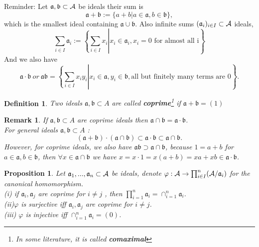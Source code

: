 \documentclass[11pt]{article}
\newtheorem{prop}[thm]{Proposition}
\newtheorem{dfn}[thm]{Definition}
\newtheorem{rmk}[thm]{Remark}
\newcommand{\sca}{{\mathfrak a}}
\newcommand{\scb}{{\mathfrak b}}
\newcommand{\cala}{{\cal A}}
\begin{document}
Reminder: Let $\sca,\scb \subset \cala$ be ideals their sum is 
$$
\sca+\scb:=\{a+b|a\in \sca, b\in \scb\},
$$
which is the smallest ideal containing $\sca\cup\scb$.
Also infinite sums $(\sca_i)_{i\in I}\subset \cala$ ideals,
$$
\sum_{i\in I }\sca_i :=\left.\left\{\sum_{i\in I}x_i \right| x_i\in \sca_i,  x_i =0 \text{ for almost all i}\right\}
$$
And we also have
$$
\sca\cdot \scb\ or\ \sca\scb=\left.\left\{\sum_{i\in I}x_i y_i\right|x_i \in \sca , y_i\in \scb, \text{all but finitely many terms are }0\right\}.
$$
\begin{dfn}
Two ideals $\sca, \scb\subset A$ are called \textbf{coprime}\footnote{In some literature, it is called \textbf{comaximal}} if $\sca+\scb=(1)$ 
\end{dfn}
\begin{rmk}
If $\sca,\scb\subset A$ are coprime ideals then $\sca\cap \scb =\sca\cdot \scb$.\\
For general ideals $\sca,\scb\subset A$ :
$$
(\sca+\scb)\cdot(\sca\cap \scb)\subset \sca\cdot \scb\subset \sca\cap \scb.
$$
However, for coprime ideals, we also have $\sca\scb \supset \sca\cap\scb$, because $1=a+b$ for $a\in\sca, b\in \scb$, then
$\forall x\in \sca\cap\scb$ we have $x=x\cdot 1=x(a+b)=xa+xb\in \sca\cdot \scb$.
\end{rmk}

\begin{prop}
Let $\sca_1,...,\sca_n \subset \cala$ be ideals, denote $\varphi: \cala\rightarrow \prod_{i\in I}^n(\cala/\sca_{i})$ for the canonical homomorphism.\\
(i) if $\sca_i,\sca_j$ are coprime for $i\neq j$ , then $\prod_{i=1}^n\sca_i=\cap_{i=1}^n\sca_i$.\\
(ii)$\varphi$ is surjective iff $\sca_i,\sca_j$ are coprime for $i\neq  j$.\\
(iii) $\varphi$ is injective iff $\cap_{i=1}^n\sca_i=(0)$.
\end{prop}
\end{document}
